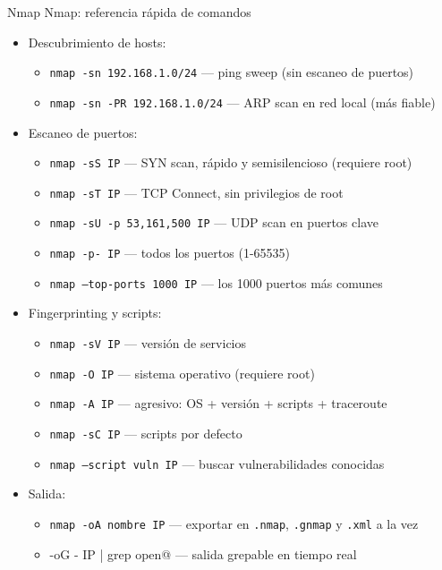 \documentclass[aspectratio=169,11pt]{beamer}
\newcommand{\cmd}[1]{\texttt{\color{uznavy}#1}}
\begin{document}
\begin{frame}{Nmap}
\small
Nmap: referencia rápida de comandos
  \begin{itemize}
  \item Descubrimiento de hosts:
    \begin{itemize}
    \item \cmd{nmap -sn 192.168.1.0/24} --- ping sweep (sin escaneo de puertos)
    \item \cmd{nmap -sn -PR 192.168.1.0/24} --- ARP scan en red local (más fiable)
    \end{itemize}
  \item Escaneo de puertos:
    \begin{itemize}
    \item \cmd{nmap -sS IP} --- SYN scan, rápido y semisilencioso (requiere root)
    \item \cmd{nmap -sT IP} --- TCP Connect, sin privilegios de root
    \item \cmd{nmap -sU -p 53,161,500 IP} --- UDP scan en puertos clave
    \item \cmd{nmap -p- IP} --- todos los puertos (1-65535)
    \item \cmd{nmap --top-ports 1000 IP} --- los 1000 puertos más comunes
    \end{itemize}
  \item Fingerprinting y scripts:
    \begin{itemize}
    \item \cmd{nmap -sV IP} --- versión de servicios
    \item \cmd{nmap -O IP} --- sistema operativo (requiere root)
    \item \cmd{nmap -A IP} --- agresivo: OS + versión + scripts + traceroute
    \item \cmd{nmap -sC IP} --- scripts por defecto
    \item \cmd{nmap --script vuln IP} --- buscar vulnerabilidades conocidas
    \end{itemize}
  \item Salida:
    \begin{itemize}
    \item \cmd{nmap -oA nombre IP} --- exportar en \cmd{.nmap}, \cmd{.gnmap} y \cmd{.xml} a la vez
    \item \verb@nmap -oG - IP | grep open@ --- salida grepable en tiempo real
    \end{itemize}
  \end{itemize}
\end{frame}
\end{document}
